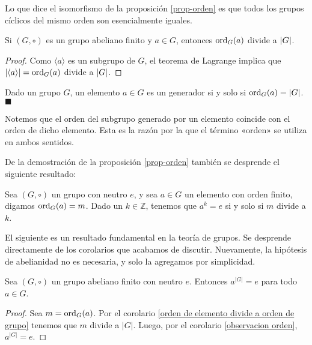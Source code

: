Lo que dice el isomorfismo de la proposición \ref{prop-orden} es que todos los grupos cíclicos del mismo orden son esencialmente iguales.

\begin{corollary} \label{orden de elemento divide a orden de grupo}
Si $(G, \circ)$ es un grupo abeliano finito y $a \in G$, entonces $\mathrm{ord}_{G}(a)$ divide a $\lvert G\rvert$.
\end{corollary}

\begin{proof}
Como $\langle a \rangle$ es un subgrupo de $G$, el teorema de Lagrange implica que $\lvert\langle a \rangle\rvert = \mathrm{ord}_{G}(a)$ divide a $\lvert G\rvert$.
\end{proof}

\begin{remark}
Dado un grupo $G$, un elemento $a \in G$ es un generador si y solo si $\mathrm{ord}_{G}(a) = |G|$.
\hfill$\blacksquare$
\end{remark}

Notemos que el orden del subgrupo generado por un elemento coincide con el orden de dicho elemento. Esta es la razón por la que el término «orden» se utiliza en ambos sentidos.



De la demostración de la proposición \ref{prop-orden} también se desprende el siguiente resultado:

\begin{corollary} \label{observacion orden}
Sea $(G, \circ)$ un grupo con neutro $e$, y sea $a \in G$ un elemento con orden finito, digamos $\mathrm{ord}_{G}(a) = m$. Dado un $k \in \mathbb{Z}$, tenemos que $a^k = e$ si y solo si $m$ divide a $k$.
\end{corollary}

El siguiente es un resultado fundamental en la teoría de grupos. Se desprende directamente de los corolarios que acabamos de discutir. Nuevamente, la hipótesis de abelianidad no es necesaria, y solo la agregamos por simplicidad.

\begin{prop} \label{PTF para grupos finitos}
Sea $(G, \circ)$ un grupo abeliano finito con neutro $e$. Entonces $a^{|G|} = e$ para todo $a \in G$.
\end{prop}

\begin{proof}
Sea $m = \mathrm{ord}_{G}(a)$. Por el corolario \ref{orden de elemento divide a orden de grupo} tenemos que $m$ divide a $|G|$. Luego, por el corolario \ref{observacion orden}, $a^{|G|} = e$.
\end{proof}


